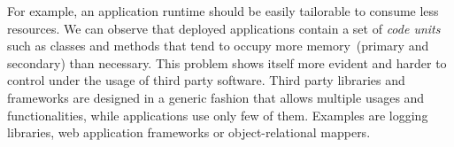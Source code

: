



For example, an application runtime should be easily tailorable to consume less resources. We can observe that deployed applications contain a set of \emph{code units} such as classes and methods that tend to occupy more memory~(primary and secondary) than necessary.
This problem shows itself more evident and harder to control under the usage of third party software. 
Third party libraries and frameworks are designed in a generic fashion that allows multiple usages and functionalities, while applications use only few of them. 
Examples are logging libraries, web application frameworks or object-relational mappers.


